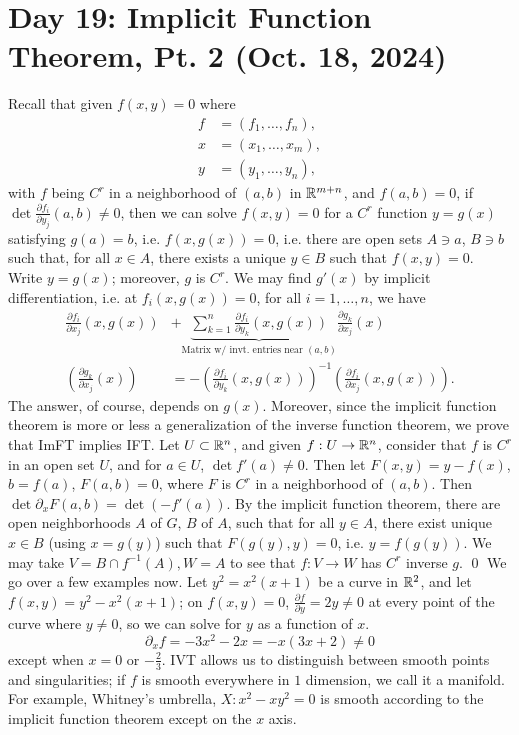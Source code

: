 \section{Day 19: Implicit Function Theorem, Pt. 2 (Oct. 18, 2024)}
Recall that given $f(x, y) = 0$ where
\begin{align*}
    f &= (f_1, \dots, f_n), \\
    x &= (x_1, \dots, x_m), \\
    y &= (y_1, \dots, y_n),
\end{align*}
with $f$ being $C^r$ in a neighborhood of $(a, b)$ in $\mathbb R^{m + n}$, and $f(a, b) = 0$, if $\det \frac{\partial f_i}{\partial y_j} (a, b) \neq 0$, then we can solve $f(x, y) = 0$ for a $C^r$ function $y = g(x)$ satisfying $g(a) = b$, i.e. $f(x, g(x)) = 0$, i.e. there are open sets $A \ni a$, $B \ni b$ such that, for all $x \in A$, there exists a unique $y \in B$ such that $f(x, y) = 0$. Write $y = g(x)$; moreover, $g$ is $C^r$.
\medskip\newline
We may find $g'(x)$ by implicit differentiation, i.e. at $f_i(x, g(x)) = 0$, for all $i = 1, \dots, n$, we have
\begin{align*}
    \frac{\partial f_i}{\partial x_j} (x, g(x)) &+ \underbrace{\sum_{k=1}^n \frac{\partial f_i}{\partial y_k} (x, g(x))}_{\text{Matrix w/ invt. entries near }(a, b)} \frac{\partial g_k}{\partial x_j}(x) \\
    \left(\frac{\partial g_k}{\partial x_j}(x)\right) &= -\left(\frac{\partial f_i}{\partial y_k}(x, g(x))\right)^{-1} \left(\frac{\partial f_i}{\partial x_j}(x, g(x))\right).
\end{align*}
The answer, of course, depends on $g(x)$. Moreover, since the implicit function theorem is more or less a generalization of the inverse function theorem, we prove that ImFT implies IFT. Let $U \subset \mathbb R^n$, and given $f : U \to \mathbb R^n$, consider that $f$ is $C^r$ in an open set $U$, and for $a \in U$, $\det f'(a) \neq 0$. Then let $F(x, y) = y - f(x)$, $b = f(a)$, $F(a, b) = 0$, where $F$ is $C^r$ in a neighborhood of $(a, b)$. Then $\det \partial_x F (a, b) = \det (- f'(a))$. By the implicit function theorem, there are open neighborhoods $A$ of $G$, $B$ of $A$, such that for all $y \in A$, there exist unique $x \in B$ (using $x = g(y)$) such that $F(g(y), y) = 0$, i.e. $y = f(g(y))$. We may take $V = B \cap f^{-1}(A), W = A$ to see that $f : V \to W$ has $C^r$ inverse $g$. \qed
\medskip\newline
We go over a few examples now. Let $y^2 = x^2(x + 1)$ be a curve in $\mathbb R^2$, and let $f(x, y) = y^2 - x^2(x+1)$; on $f(x, y) = 0$, $\frac{\partial f}{\partial y} = 2y \neq 0$ at every point of the curve where $y \neq 0$, so we can solve for $y$ as a function of $x$.
\[ \partial_x f = -3x^2 - 2x = -x(3x + 2) \neq 0 \]
except when $x = 0$ or $-\frac{2}{3}$. IVT allows us to distinguish between smooth points and singularities; if $f$ is smooth everywhere in $1$ dimension, we call it a manifold. For example, Whitney's umbrella, $X : x^2 - xy^2 = 0$ is smooth according to the implicit function theorem except on the $x$ axis.